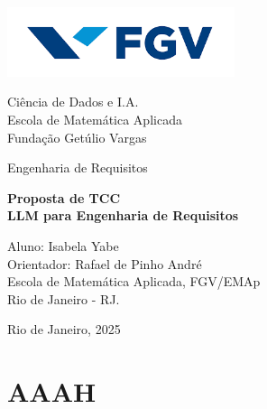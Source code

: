 \documentclass[12pt,a4paper]{article}
\begin{document}
\begin{titlepage}
    \begin{center}
        \vspace*{0cm}
        
            \includegraphics[width=0.5\textwidth]{Images/Logo_FGV.png} 
            
        \vspace{1.5cm}
        \large
        
        Ciência de Dados e I.A.\\
        Escola de Matemática Aplicada\\
        Fundação Getúlio Vargas\\

        \vspace{1cm}  
    
        \Large
        Engenharia de Requisitos
            
        \vspace{2cm}
        
        \vspace{0.25cm}

        \Huge \textbf{Proposta de TCC} \\ 
        \vspace{0.5cm}
        \huge \textbf{LLM para Engenharia de Requisitos}
        \vspace{3.6cm}
        
        \large
                Aluno: Isabela Yabe\\
                Orientador: Rafael de Pinho André\\
                Escola de Matemática Aplicada, FGV/EMAp \\
                Rio de Janeiro - RJ.
        \vfill
            
        \vspace{0.8cm}  
        
        Rio de Janeiro, 2025
            
    \end{center}
\end{titlepage}

\newpage
\tableofcontents

\newpage

\section{AAAH}
\end{document}
